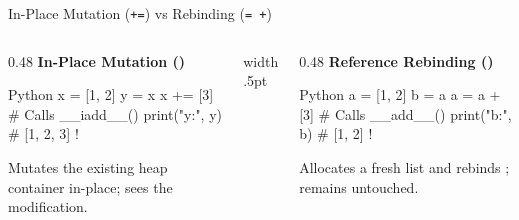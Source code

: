 \begin{frame}[fragile]{In-Place Mutation (\texttt{+=}) vs Rebinding (\texttt{= +})}
  \begin{columns}[T,onlytextwidth]
    \begin{column}{0.48\textwidth}
      {\small\bfseries\color{AWSBlue}In-Place Mutation ()}\par\vspace{0.08cm}
      \begin{CodeBlock}{Python}
x = [1, 2]
y = x
x += [3]  # Calls __iadd__()
print("y:", y)  # [1, 2, 3] !
      \end{CodeBlock}
      \vspace{0.05cm}
      {\scriptsize\color{UpGradRedDark}Mutates the existing heap container in-place;  sees the modification.}
    \end{column}
    \hfill{\color{UpGradRule}\vrule width .5pt}\hfill
    \begin{column}{0.48\textwidth}
      {\small\bfseries\color{UpGradRed}Reference Rebinding ()}\par\vspace{0.08cm}
      \begin{CodeBlock}{Python}
a = [1, 2]
b = a
a = a + [3]  # Calls __add__()
print("b:", b)  # [1, 2] !
      \end{CodeBlock}
      \vspace{0.05cm}
      {\scriptsize\color{AWSEmerald}Allocates a fresh list and rebinds ;  remains untouched.}
    \end{column}
  \end{columns}
  \vspace{0.18cm}
\end{frame}

